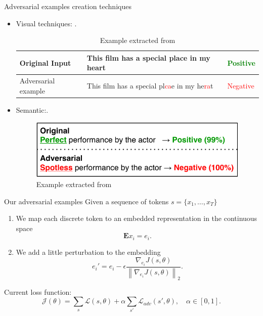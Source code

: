 \documentclass[aspectratio=169]{beamer}
\newcommand{\norm}[1]{\left\lVert#1\right\rVert}
\begin{document}
  \begin{frame}{Adversarial examples creation techniques}

    \begin{itemize}
      \item Visual techniques: \citep{DBLP:journals/corr/abs-2005-05909}.\\
      \vspace{0.4cm}

      \begin{table}[H]
        \begin{tabular}{l|l|l}
        Original Input      & This film has a special place in my heart & \textcolor{green}{Positive} \\ \hline
        Adversarial example & This film has a special pl\textcolor{red}{ca}e in my he\textcolor{red}{ra}t & \textcolor{red}{Negative}
        \end{tabular}
        \caption{Example extracted from \citep{DBLP:journals/corr/abs-1801-04354}}
        \end{table}
      \item Semantic:\citep{DBLP:journals/corr/abs-1907-11932}.\\
        \vspace{0.4cm}
      \begin{figure}[H]
        \centering
        \includegraphics[scale=0.5]{00-ae-example}
        \caption{Example extracted from \citep{DBLP:journals/corr/abs-1907-11932}}
      \end{figure}

    \end{itemize}
  \end{frame}

  \begin{frame}{Our adversarial examples}
    Given a sequence of tokens \(s = \{x_1,\dots,x_T\}\)
    \begin{enumerate}
      \item We map each discrete token to an embedded representation in the continuous space
      \[
        \mathbf{E}x_i = e_i.  
      \]
      \item We add a little perturbation to the embedding
      \[
      e_i' = e_i - \epsilon \frac{\nabla_{e_i}J(s,\theta)}{\norm{\nabla_{e_i}J(s,\theta)}_2}.
      \]
      
    \end{enumerate}

    Current loss function:
    \[
    \mathcal J(\theta) = \sum_s \mathcal L(s,\theta) + \alpha \sum_{s'} \mathcal L_{adv} (s',\theta), \quad \alpha \in [0,1].  
    \]
  \end{frame}
\end{document}
